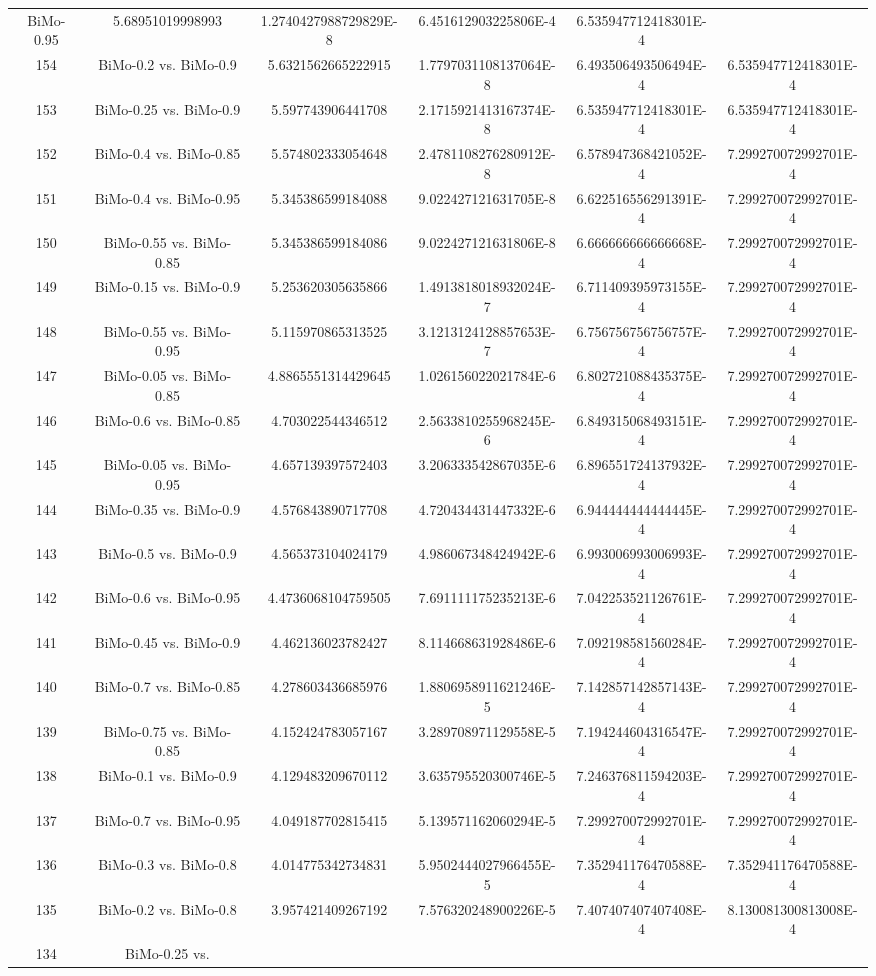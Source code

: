\documentclass[a4paper,10pt]{article}
\begin{document}
\begin{landscape}
\begin{table}[!htp]
\begin{tabular}{cccccc}
BiMo-0.95&5.68951019998993&1.2740427988729829E-8&6.451612903225806E-4&6.535947712418301E-4\\154&BiMo-0.2 vs. BiMo-0.9&5.6321562665222915&1.7797031108137064E-8&6.493506493506494E-4&6.535947712418301E-4\\153&BiMo-0.25 vs. BiMo-0.9&5.597743906441708&2.1715921413167374E-8&6.535947712418301E-4&6.535947712418301E-4\\152&BiMo-0.4 vs. BiMo-0.85&5.574802333054648&2.4781108276280912E-8&6.578947368421052E-4&7.299270072992701E-4\\151&BiMo-0.4 vs. BiMo-0.95&5.345386599184088&9.022427121631705E-8&6.622516556291391E-4&7.299270072992701E-4\\150&BiMo-0.55 vs. BiMo-0.85&5.345386599184086&9.022427121631806E-8&6.666666666666668E-4&7.299270072992701E-4\\149&BiMo-0.15 vs. BiMo-0.9&5.253620305635866&1.4913818018932024E-7&6.711409395973155E-4&7.299270072992701E-4\\148&BiMo-0.55 vs. BiMo-0.95&5.115970865313525&3.1213124128857653E-7&6.756756756756757E-4&7.299270072992701E-4\\147&BiMo-0.05 vs. BiMo-0.85&4.8865551314429645&1.026156022021784E-6&6.802721088435375E-4&7.299270072992701E-4\\146&BiMo-0.6 vs. BiMo-0.85&4.703022544346512&2.5633810255968245E-6&6.849315068493151E-4&7.299270072992701E-4\\145&BiMo-0.05 vs. BiMo-0.95&4.657139397572403&3.206333542867035E-6&6.896551724137932E-4&7.299270072992701E-4\\144&BiMo-0.35 vs. BiMo-0.9&4.576843890717708&4.720434431447332E-6&6.944444444444445E-4&7.299270072992701E-4\\143&BiMo-0.5 vs. BiMo-0.9&4.565373104024179&4.986067348424942E-6&6.993006993006993E-4&7.299270072992701E-4\\142&BiMo-0.6 vs. BiMo-0.95&4.4736068104759505&7.691111175235213E-6&7.042253521126761E-4&7.299270072992701E-4\\141&BiMo-0.45 vs. BiMo-0.9&4.462136023782427&8.114668631928486E-6&7.092198581560284E-4&7.299270072992701E-4\\140&BiMo-0.7 vs. BiMo-0.85&4.278603436685976&1.8806958911621246E-5&7.142857142857143E-4&7.299270072992701E-4\\139&BiMo-0.75 vs. BiMo-0.85&4.152424783057167&3.289708971129558E-5&7.194244604316547E-4&7.299270072992701E-4\\138&BiMo-0.1 vs. BiMo-0.9&4.129483209670112&3.635795520300746E-5&7.246376811594203E-4&7.299270072992701E-4\\137&BiMo-0.7 vs. BiMo-0.95&4.049187702815415&5.139571162060294E-5&7.299270072992701E-4&7.299270072992701E-4\\136&BiMo-0.3 vs. BiMo-0.8&4.014775342734831&5.9502444027966455E-5&7.352941176470588E-4&7.352941176470588E-4\\135&BiMo-0.2 vs. BiMo-0.8&3.957421409267192&7.576320248900226E-5&7.407407407407408E-4&8.130081300813008E-4\\134&BiMo-0.25 vs. 
\end{tabular}
\end{table}
\end{landscape}
\end{document}
